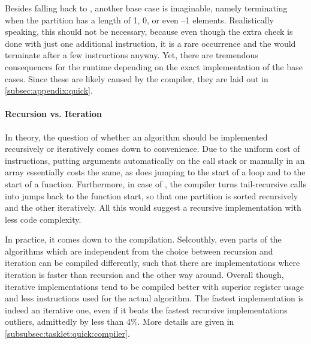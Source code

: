 Besides falling back to \IS{}, another base case is imaginable, namely terminating when the partition has a length of 1, 0, or even --1 elements.
Realistically speaking, this should not be necessary, because even though the extra check is done with just one additional instruction, it is a rare occurrence and the \IS{} would terminate after a few instructions anyway.
Yet, there are tremendous consequences for the runtime depending on the exact implementation of the base cases.
Since these are likely caused by the compiler, they are laid out in \cref{subsec:appendix:quick}.


\paragraph{Recursion vs. Iteration}
In theory, the question of whether an algorithm should be implemented recursively or iteratively comes down to convenience.
Due to the uniform cost of instructions, putting arguments automatically on the call stack or manually in an array essentially costs the same, as does jumping to the start of a loop and to the start of a function.
Furthermore, in case of \QS{}, the compiler turns tail-recursive calls into jumps back to the function start, so that one partition is sorted recursively and the other iteratively.
All this would suggest a recursive implementation with less code complexity.

In practice, it comes down to the compilation.
Selcouthly, even parts of the algorithms which are independent from the choice between recursion and iteration can be compiled differently, such that there are implementations where iteration is faster than recursion and the other way around.
Overall though, iterative implementations tend to be compiled better with superior register usage and less instructions used for the actual \QS{} algorithm.
The fastest implementation is indeed an iterative one, even if it beats the fastest recursive implementations \Dash outliers, admittedly \Dash by less than 4\%.
More details are given in \cref{subsubsec:tasklet:quick:compiler}.


